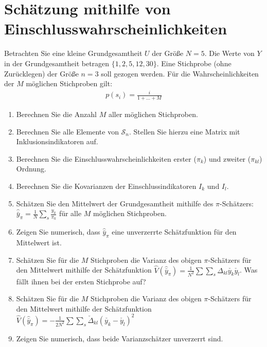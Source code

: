 \documentclass{article}
\begin{document}
\section{Schätzung mithilfe von Einschlusswahrscheinlichkeiten}
Betrachten Sie eine kleine Grundgesamtheit $U$ der Größe $N=5$. Die Werte von $Y$ in der Grundgesamtheit betragen $\{1,2,5,12,30\}$. Eine Stichprobe (ohne Zurücklegen) der Größe $n=3$ soll gezogen werden. Für die Wahrscheinlichkeiten der $M$ möglichen Stichproben gilt:
\begin{align*}
p(s_i) = \frac{i}{1+\dots+M}
\end{align*}
\begin{enumerate}
	\item Berechnen Sie die Anzahl $M$ aller möglichen Stichproben.
	\item Berechnen Sie alle Elemente von $\mathcal{S}_n$. Stellen Sie hierzu eine Matrix mit Inklusionsindikatoren auf.
	\item Berechnen Sie die Einschlusswahrscheinlichkeiten erster ($\pi_k$) und zweiter ($\pi_{kl}$) Ordnung.
	\item Berechnen Sie die Kovarianzen der Einschlussindikatoren $I_k$ und $I_l$.
	\item Schätzen Sie den Mittelwert der Grundgesamtheit mithilfe des $\pi$-Schätzers: $\hat{\bar{y}}_\pi = \frac{1}{N} \sum_s \frac{y_k}{\pi_k}$
	für alle $M$ möglichen Stichproben. 
	\item Zeigen Sie numerisch, dass $\hat{\bar{y}}_\pi$ eine unverzerrte Schätzfunktion für den Mittelwert ist.
	\item Schätzen Sie für die $M$ Stichproben die Varianz des obigen $\pi$-Schätzers für den Mittelwert mithilfe der Schätzfunktion
	$
	\hat{V}(\hat{\bar{y}}_\pi) = \frac{1}{N^2} \sum \sum_s \Delta_{kl}\check{y_k}\check{y_l}
	$.
	Was fällt ihnen bei der ersten Stichprobe auf? 
	\item Schätzen Sie für die $M$ Stichproben die Varianz des obigen $\pi$-Schätzers für den Mittelwert mithilfe der Schätzfunktion
	$
	\hat{V}(\hat{\bar{y}}_\pi) = -\frac{1}{2N^2} \sum \sum_s \check{\Delta}_{kl}(\check{y_k}-\check{y_l})^2
	$	
	\item Zeigen Sie numerisch, dass beide Varianzschätzer unverzerrt sind. 
\end{enumerate}
\end{document}
